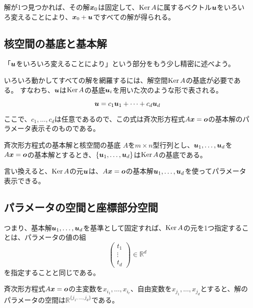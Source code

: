 \documentclass[../../../topic_linear-algebra]{subfiles}
\begin{document}
\br

解が1つ見つかれば、その解$\vb*{x}_0$は固定して、$\operatorname{Ker} A$に属するベクトル$\vb*{u}$をいろいろ変えることにより、$\vb*{x}_0 + \vb*{u}$ですべての解が得られる。

\subsection{核空間の基底と基本解}

「$\vb*{u}$をいろいろ変えることにより」という部分をもう少し精密に述べよう。

いろいろ動かしてすべての解を網羅するには、解空間$\operatorname{Ker} A$の基底が必要である。
すなわち、$\vb*{u}$は$\operatorname{Ker} A$の基底$\vb*{u}_i$を用いた次のような形で表される。

\begin{equation*}
  \vb*{u} = c_1 \vb*{u}_1 + \cdots + c_d \vb*{u}_d
\end{equation*}

ここで、$c_1, \ldots, c_d$は任意であるので、この式は斉次形方程式$A\vb*{x} = \vb*{o}$の基本解のパラメータ表示そのものである。

\begin{theorem*}{斉次形方程式の基本解と核空間の基底}
  $A$を$m \times n$型行列とし、$\vb*{u}_1, \dots, \vb*{u}_d$を$A\vb*{x} = \vb*{o}$の基本解とするとき、$\{ \vb*{u}_1, \dots, \vb*{u}_d \}$は$\operatorname{Ker} A$の基底である。
\end{theorem*}

言い換えると、$\operatorname{Ker} A$の元$\vb*{u}$は、$A\vb*{x} = \vb*{o}$の基本解$\vb*{u}_1,\dots,\vb*{u}_d$を使ってパラメータ表示できる。

\subsection{パラメータの空間と座標部分空間}

つまり、基本解$\vb*{u}_1, \dots, \vb*{u}_d$を基準として固定すれば、$\operatorname{Ker} A$の元を1つ指定することは、パラメータの値の組
\begin{equation*}
  \begin{pmatrix}
    t_1    \\
    \vdots \\
    t_d
  \end{pmatrix} \in \mathbb{R}^d
\end{equation*}
を指定することと同じである。

\br

斉次形方程式$A\vb*{x} = \vb*{o}$の主変数を$x_{i_1}, \dots, x_{i_r}$、自由変数を$x_{j_1}, \dots, x_{j_d}$とすると、解のパラメータの空間は$\mathbb{R}^{\{ j_1, \dots, j_d \}}$である。
\end{document}
